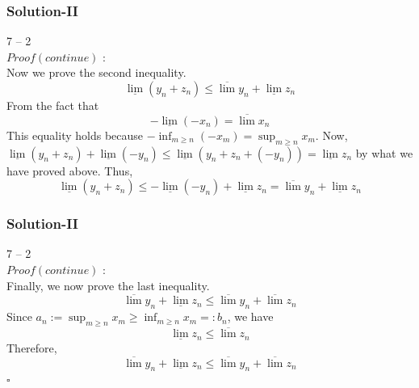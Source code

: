 \documentclass[12pt, t]{beamer}
\newcommand{\myqed}{\hfill$\square$}
\begin{document}
\begin{frame}
    \frametitle{Solution-II}
    7 -- 2\\
    $Proof(continue)$ : \\
    \hspace{1em} Now we prove the second inequality.
    \begin{equation*}
        \underline{\lim} (y_n+z_n)\leq\overline{\lim}y_n+\underline{\lim}z_n
    \end{equation*}
    \hspace{1em} From the fact that
    \begin{equation*}
        -\underline{\lim}(-x_n)=\overline{\lim}x_n
    \end{equation*}
    \hspace{1em} This equality holds because $-\inf_{m\geq n}(-x_m)=\sup_{m\geq n}x_m$. Now,
    $\underline{\lim}(y_n+z_n)+\underline{\lim}(-y_n)\leq \underline{\lim}(y_n+z_n+(-y_n))=\underline{\lim}z_n$
    by what we have proved above. Thus,
    \begin{equation*}
        \underline{\lim}(y_n+z_n)\leq -\underline{\lim}(-y_n)+\underline{\lim}z_n=\overline{\lim}y_n+\underline{\lim}z_n
    \end{equation*}

\end{frame}


\begin{frame}
    \frametitle{Solution-II}
    7 -- 2\\
    $Proof(continue)$ : \\
    \hspace{1em} Finally, we now prove the last inequality.
    \begin{equation*}
        \overline{\lim}y_n+\underline{\lim}z_n\leq\overline{\lim}y_n+\overline{\lim}z_n
    \end{equation*}
    \hspace{1em} Since $a_n:=\sup_{m\geq n}x_m\geq \inf_{m\geq n}x_m=:b_n$, we have
    \begin{equation*}
        \underline{\lim}z_n\leq \overline{\lim}z_n
    \end{equation*}
    \hspace{1em} Therefore,
    \begin{equation*}
        \overline{\lim}y_n+\underline{\lim}z_n\leq\overline{\lim}y_n+\overline{\lim}z_n
    \end{equation*}
    \myqed
\end{frame}
\end{document}
